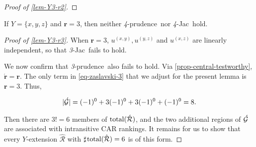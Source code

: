 \documentclass[12pt,a4paper,twoside]{article}
\makeatletter
\newcommand{\srcsize}{\@setfontsize{\srcsize}{3pt}{3pt}}
\newcommand\mdoubleplus{\text{\srcsize$+\mkern-2mu+$}}
\newcommand{\countof}{\mathbin{\sharp}\hskip1pt}
\newcommand{\hext}{\mathrel{\hat{\mathrel{\mathcal R}}}}
\newcommand{\aext}{\mathrel{\acute{\mathrel{\mathcal R}}}}
\newcommand{\total}{\textup{total}}
\newcommand{\xy}{{(x, y)}}
\newcommand{\yz}{{(y,z)}}
\newcommand{\xz}{{(x,z)}}
\newcommand{\fourpru}{\textit{4}-\textup{prudence}}
\newcommand{\threepru}{\textit{3}-\textup{prudence}}
\newcommand{\fourjac}{\textup{\textit{4}-Jac}}
\newcommand{\threejac}{\textup{\textit{3}-Jac}}
\makeatother
\begin{document}
\begin{appendices}
\begin{proof}[Proof of \cref{lem-Y3-r2}]
\end{proof}

\begin{lemma}\label{lem-Y3-r3}
  If $Y = \{x,y,z\} $ and  $ \mathbf{r} = 3 $, then neither \fourpru\ nor
  \fourjac\ hold.
\end{lemma}
\begin{proof}[Proof of \cref{lem-Y3-r3}]
  When $\mathbf r = 3$, $u^{\xy}, u^{\yz}$ and $ u^{\xz}$ are linearly
  independent, so that \threejac\ fails to hold.

  We now confirm that \threepru\ also fails to hold.  Via
  \cref{prop-central-testworthy}, $\acute{\mathbf r} = \mathbf r $.  The only
  term in \cref{eq-zaslavski-3} that we adjust for the present lemma is
  $\mathbf{r}=3$. Thus,
\begin{linenomath*}
  \begin{align*}
    \lvert \acute{\mathcal G}\rvert
    = (-1)^{0}+3(-1)^{0}+ 3(-1)^{0}+(-1)^{0} = 8.
  \end{align*}
\end{linenomath*}
\addtocounter{linenumber}{-1}
  Then there are $3!=6$ members of $\total (\aext)$, and the two additional
  regions of $\acute {\mathcal G}$ are associated with intransitive CAR rankings. It
  remains for us to show that every $Y$-extension $\hext$ with
  $\countof \total (\hext) = 6$ is of this form. %
  

\end{proof}
\end{appendices}
\end{document}
